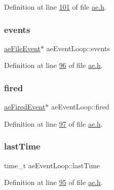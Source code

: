 Definition at line \hyperlink{ae_8h_source_l00101}{101} of file \hyperlink{ae_8h_source}{ae.\+h}.

\mbox{\label{structaeEventLoop_aa37dcf314ec826fafa4b3ff05923b434}} 
\subsubsection{\texorpdfstring{events}{events}}
{\footnotesize\ttfamily \hyperlink{structaeFileEvent}{ae\+File\+Event}$\ast$ ae\+Event\+Loop\+::events}



Definition at line \hyperlink{ae_8h_source_l00096}{96} of file \hyperlink{ae_8h_source}{ae.\+h}.

\mbox{\label{structaeEventLoop_aa2ccda94b3ee8a43a4802bd1f8443609}} 
\subsubsection{\texorpdfstring{fired}{fired}}
{\footnotesize\ttfamily \hyperlink{structaeFiredEvent}{ae\+Fired\+Event}$\ast$ ae\+Event\+Loop\+::fired}



Definition at line \hyperlink{ae_8h_source_l00097}{97} of file \hyperlink{ae_8h_source}{ae.\+h}.

\mbox{\label{structaeEventLoop_aead81eebbc8104bef63d9372fabc1b61}} 
\subsubsection{\texorpdfstring{last\+Time}{lastTime}}
{\footnotesize\ttfamily time\+\_\+t ae\+Event\+Loop\+::last\+Time}



Definition at line \hyperlink{ae_8h_source_l00095}{95} of file \hyperlink{ae_8h_source}{ae.\+h}.

\mbox{\label{structaeEventLoop_aedf39e37f559c83d9a0ae1ae07e5b8c1}} 
